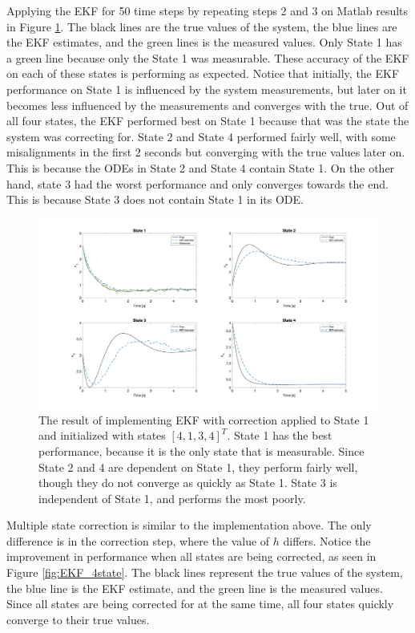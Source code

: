 \newpage
\noindent Applying the EKF for 50 time steps by repeating steps 2 and 3 on Matlab results in Figure \ref{fig:EKF_1state}. The black lines are the true values of the system, the blue lines are the EKF estimates, and the green lines is the measured values. Only State 1 has a green line because only the State 1 was measurable. These accuracy of the EKF on each of these states is performing as expected. Notice that initially, the EKF performance on State 1 is influenced by the system measurements, but later on it becomes less influenced by the measurements and converges with the true. Out of all four states, the EKF performed best on State 1 because that was the state the system was correcting for.  State 2 and State 4 performed fairly well, with some misalignments in the first 2 seconds but converging with the true values later on. This is because the ODEs in State 2 and State 4 contain State 1. On the other hand, state 3 had the worst performance and only converges towards the end. This is because State 3 does not contain State 1 in its ODE.  \\

\begin{figure}[ht]
    \centering
    \includegraphics[scale = 0.3]{EKF_1state.png}
    \caption{The result of implementing EKF with correction applied to State 1 and initialized with states $[4, 1, 3, 4]^T$. State 1 has the best performance, because it is the only state that is measurable. Since State 2 and 4 are dependent on State 1, they perform fairly well, though they do not converge as quickly as State 1. State 3 is independent of State 1, and performs the most poorly.}
    \label{fig:EKF_1state}
  \end{figure}
  \clearpage


\noindent Multiple state correction is similar to the implementation above. The only difference is in the correction step, where the value of $h$ differs. Notice the improvement in performance when all states are being corrected, as seen in Figure \ref{fig:EKF_4state}. The black lines represent the true values of the system, the blue line is the EKF estimate, and the green line is the measured values.  Since all states are being corrected for at the same time, all four states quickly converge to their true values. \\


